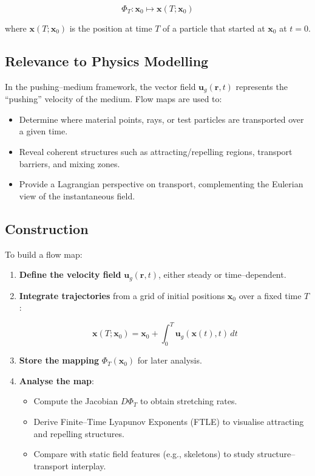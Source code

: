\documentclass[10pt,a4paper]{article}
\begin{document}
\begin{multicols}{2}
\[
\Phi_T : \mathbf{x}_0 \mapsto \mathbf{x}(T; \mathbf{x}_0)
\]


where $\mathbf{x}(T; \mathbf{x}_0)$ is the position at time $T$ of a particle that started at $\mathbf{x}_0$ at $t=0$.

\subsection*{Relevance to Physics Modelling}
In the pushing--medium framework, the vector field $\mathbf{u}_g(\mathbf{r},t)$ represents the ``pushing'' velocity of the medium.  
Flow maps are used to:
\begin{itemize}
    \item Determine where material points, rays, or test particles are transported over a given time.
    \item Reveal coherent structures such as attracting/repelling regions, transport barriers, and mixing zones.
    \item Provide a Lagrangian perspective on transport, complementing the Eulerian view of the instantaneous field.
\end{itemize}

\subsection*{Construction}
To build a flow map:
\begin{enumerate}
    \item \textbf{Define the velocity field} $\mathbf{u}_g(\mathbf{r},t)$, either steady or time--dependent.
    \item \textbf{Integrate trajectories} from a grid of initial positions $\mathbf{x}_0$ over a fixed time $T$:
    

\[
    \mathbf{x}(T; \mathbf{x}_0) = \mathbf{x}_0 + \int_0^T \mathbf{u}_g(\mathbf{x}(t), t) \, dt
    \]


    \item \textbf{Store the mapping} $\Phi_T(\mathbf{x}_0)$ for later analysis.
    \item \textbf{Analyse the map}:
    \begin{itemize}
        \item Compute the Jacobian $D\Phi_T$ to obtain stretching rates.
        \item Derive Finite--Time Lyapunov Exponents (FTLE) to visualise attracting and repelling structures.
        \item Compare with static field features (e.g., skeletons) to study structure--transport interplay.
    \end{itemize}
\end{enumerate}


\end{multicols}
\end{document}
